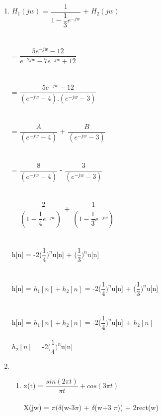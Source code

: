 \documentclass[10pt,a4paper, margin=1in]{article}
\begin{document}
\begin{enumerate}
\begin{enumerate}
    

    \end{enumerate}


\item %

    $H_{1}(jw)$ = $\dfrac{1}{1 - \dfrac{1}{3}e^{-jw}}$ + $H_{2}(jw)$ \\\\\\
    = $\dfrac{5e^{-jw} - 12}{e^{-2jw} -7e^{-jw} +12}$ \\\\\\
    = $\dfrac{5e^{-jw} - 12}{(e^{-jw} - 4).(e^{-jw} - 3)}$ \\\\\\
    = $\dfrac{A}{(e^{-jw} - 4)}$ + $\dfrac{B}{(e^{-jw} - 3)}$ \\\\\\
    = $\dfrac{8}{(e^{-jw} - 4)}$ - $\dfrac{3}{(e^{-jw} - 3)}$ \\\\\\
    = $\dfrac{-2}{(1 - \dfrac{1}{4}e^{-jw})}$ + $\dfrac{1}{(1 -\dfrac{1}{3}e^{-jw})}$\\\\\\
     h[n] = -2($\dfrac{1}{4})^n$u[n] + ($\dfrac{1}{3})^n$u[n]\\\\\\
     h[n] = $ h_{1}[n] + h_{2}[n]$ = -2($\dfrac{1}{4})^n$u[n] + ($\dfrac{1}{3})^n$u[n]\\\\\\
     h[n] = $ h_{1}[n] + h_{2}[n]$ = -2($\dfrac{1}{4})^n$u[n] +  $ h_{2}[n]$\\\\
     $h_{2}[n]$ = -2($\dfrac{1}{4})^n$u[n]\\
     
     
\item %
\begin{enumerate}
    \item %
        
    x(t) = $\dfrac{sin(2\pi t)}{\pi t} +cos(3\pi t)$\\\\
    X(jw) = $\pi (\delta$(w-3$\pi$) + $\delta$(w+3 $\pi$)) + 2rect(w)\\\\
    

\end{enumerate}
\end{enumerate}
\end{document}
